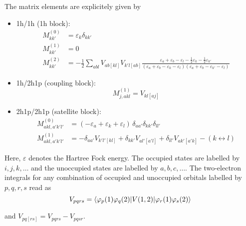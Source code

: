 The matrix elements are explicitely given by
\begin{itemize}
 \item 1h/1h (1h block):
   \begin{align}
    M_{kk'}^{(0)} &= \varepsilon_k \delta_{kk'} \\
    M_{kk'}^{(1)} &= 0 \\
    M_{kk'}^{(2)} &= -\frac12 \sum\limits_{abl} V_{ab[kl]} V_{k'l[ab]} %
                     \frac{\varepsilon_a+\varepsilon_b-\varepsilon_l
                       -\frac12 \varepsilon_k-\frac12 \varepsilon_{k'}}
                     {(\varepsilon_a+\varepsilon_b-\varepsilon_k-\varepsilon_l)
                      (\varepsilon_a+\varepsilon_b-\varepsilon_{k'}-\varepsilon_l)}
   \end{align}
 \item 1h/2h1p (coupling block):
   \begin{equation}
    M_{j,akl}^{(1)} = V_{kl[aj]}
   \end{equation}
 \item 2h1p/2h1p (satellite block):
   \begin{align}
    M_{akl,a'k'l'}^{(0)} &= (-\varepsilon_a+\varepsilon_k+\varepsilon_l)
                             \, \delta_{aa'}\delta_{kk'}\delta_{ll'} \\
    M_{akl,a'k'l'}^{(1)} &= -\delta_{aa'} V_{k'l'[kl]} + \delta_{kk'} V_{al'[a'l]}
                            +\delta_{ll'} V_{ak'[a'k]} - (k \leftrightarrow l)
   \end{align}
\end{itemize}

Here, $\varepsilon$ denotes the Hartree Fock energy. The occupied states are labelled
by $i,j,k,\dots$ and the unoccupied states are labelled by $a,b,c,\dots$. The
two-electron integrals for any combination of occupied and unoccupied orbitals
labelled by $p,q,r,s$ read as
\begin{equation}
 V_{pqrs} = \braket{\varphi_p(1)\varphi_q(2) |V(1,2)| \varphi_r(1)\varphi_s(2)}
\end{equation}

and $V_{pq[rs]} = V_{pqrs} - V_{pqsr}$.

